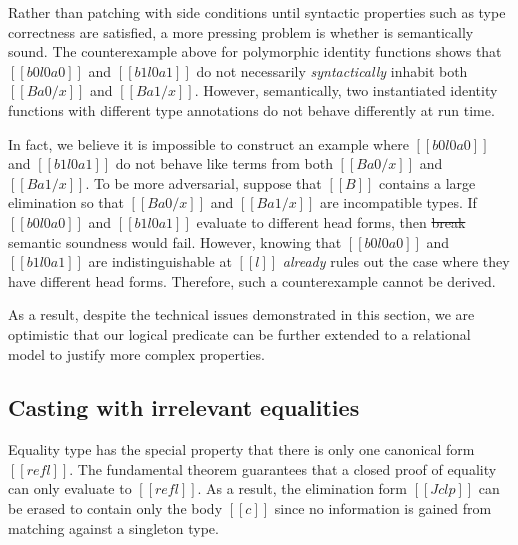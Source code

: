\documentclass[acmsmall, screen=true, nonacm=true,
  review=\ifpublic false\else true\fi,
  anonymous=\ifanonymous true\else false\fi
]{acmart}
\makeatletter
\newcommand{\name}{\texorpdfstring{DCOI$^{\omega}$\@\xspace}{DCOI-omega}}
\providecommand{\DIFdel}[1]{{\protect\color{red}\sout{#1}}}                      %
\providecommand{\DIFdelbegin}{} %
\providecommand{\DIFdelend}{} %
\makeatother
\begin{document}
Rather than patching  with side conditions until
syntactic properties such as type correctness are satisfied, a more
pressing problem is whether  is semantically sound.
The counterexample above for polymorphic identity functions
shows that $[[b0 l0 a0]]$ and $[[b1 l0 a1]]$ do not necessarily
\emph{syntactically} inhabit both $[[B {a0 / x}]]$ and $[[B {a1 / x}]]$. However,
semantically, two instantiated identity functions with different type
annotations do not behave differently at run time.

In fact, we believe it is impossible to construct an
example where $[[b0 l0 a0]]$ and $[[b1 l0 a1]]$ do not behave
like terms from both $[[B {a0 / x}]]$ and $[[B {a1 / x}]]$.
To be more adversarial, suppose that $[[B]]$ contains a large elimination so that $[[B
{a0 /x}]]$ and $[[B {a1 / x}]]$ are incompatible types. If $[[b0 l0
a0]]$ and $[[b1 l0 a1]]$ evaluate to different head forms, then
\DIFdelbegin \DIFdel{break }\DIFdelend semantic soundness would fail. However, knowing that $[[b0 l0 a0]]$ and
$[[b1 l0 a1]]$ are indistinguishable at $[[l]]$ \emph{already} rules out the
case where they have different head forms. Therefore, such a counterexample
cannot be derived.

As a result, despite the technical issues demonstrated in this section,
we are optimistic that our logical predicate can be further extended to
a relational model to justify more complex properties.


\subsection{Casting with irrelevant equalities}
\label{sec:castirrel}

Equality type has the special property that
there is only one canonical form $[[refl]]$.
The fundamental theorem guarantees that a closed proof of equality can only evaluate to
$[[refl]]$. As a result, the elimination form $[[J c l p]]$ can be
erased to contain only the body $[[c]]$
since no information is gained from
matching against a singleton type.
\end{document}
